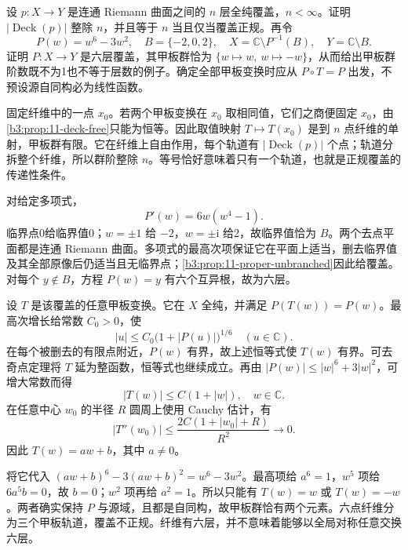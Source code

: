 \begin{exercise}\label{b3:ex:11-5}
设 \(p:X\to Y\) 是连通 Riemann 曲面之间的 \(n\) 层全纯覆盖，\(n<\infty\)。证明 \(|\operatorname{Deck}(p)|\) 整除 \(n\)，并且等于 \(n\) 当且仅当覆盖正规。再令
\[
 P(w)=w^6-3w^2,\quad B=\{-2,0,2\},\quad
 X=\mathbb C\setminus P^{-1}(B),\quad Y=\mathbb C\setminus B.
\]
证明 \(P:X\to Y\) 是六层覆盖，其甲板群恰为 \(\{w\mapsto w,\ w\mapsto-w\}\)，从而给出甲板群阶数既不为1也不等于层数的例子。确定全部甲板变换时应从 \(P\circ T=P\) 出发，不预设源自同构必为线性函数。
\end{exercise}
\begin{solution}
固定纤维中的一点 \(x_0\)。若两个甲板变换在 \(x_0\) 取相同值，它们之商便固定 \(x_0\)，由 \cref{b3:prop:11-deck-free}只能为恒等。因此取值映射 \(T\mapsto T(x_0)\) 是到 \(n\) 点纤维的单射，甲板群有限。它在纤维上自由作用，每个轨道有 \(|\operatorname{Deck}(p)|\) 个点；轨道分拆整个纤维，所以群阶整除 \(n\)。等号恰好意味着只有一个轨道，也就是正规覆盖的传递性条件。

对给定多项式，
\[
 P'(w)=6w(w^4-1).
\]
临界点0给临界值0；\(w=\pm1\) 给 \(-2\)，\(w=\pm\mathrm i\) 给2，故临界值恰为 \(B\)。两个去点平面都是连通 Riemann 曲面。多项式的最高次项保证它在平面上适当，删去临界值及其全部原像后仍适当且无临界点；\cref{b3:prop:11-proper-unbranched}因此给覆盖。对每个 \(y\notin B\)，方程 \(P(w)=y\) 有六个互异根，故为六层。

设 \(T\) 是该覆盖的任意甲板变换。它在 \(X\) 全纯，并满足 \(P(T(w))=P(w)\)。最高次增长给常数 \(C_0>0\)，使
\[
 |u|\le C_0\bigl(1+|P(u)|\bigr)^{1/6}
 \quad(u\in\mathbb C).
\]
在每个被删去的有限点附近，\(P(w)\) 有界，故上述恒等式使 \(T(w)\) 有界。可去奇点定理将 \(T\) 延为整函数，恒等式也继续成立。再由 \(|P(w)|\le |w|^6+3|w|^2\)，可增大常数而得
\[
 |T(w)|\le C(1+|w|),\quad w\in\mathbb C.
\]
在任意中心 \(w_0\) 的半径 \(R\) 圆周上使用 Cauchy 估计，有
\[
 |T''(w_0)|\le\frac{2C(1+|w_0|+R)}{R^2}
 \longrightarrow0.
\]
因此 \(T(w)=aw+b\)，其中 \(a\ne0\)。

将它代入 \((aw+b)^6-3(aw+b)^2=w^6-3w^2\)。最高项给 \(a^6=1\)，\(w^5\) 项给 \(6a^5b=0\)，故 \(b=0\)；\(w^2\) 项再给 \(a^2=1\)。所以只能有 \(T(w)=w\) 或 \(T(w)=-w\)。两者确实保持 \(P\) 与源域，且都是自同构，故甲板群恰有两个元素。六点纤维分为三个甲板轨道，覆盖不正规。纤维有六层，并不意味着能够以全局对称任意交换六层。
\end{solution}

